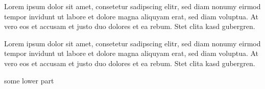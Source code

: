\begin{tcolorbox}[]

Lorem ipsum dolor sit amet, consetetur sadipscing elitr, sed diam nonumy
eirmod tempor invidunt ut labore et dolore magna aliquyam erat, sed diam
voluptua. At vero eos et accusam et justo duo dolores et ea rebum. Stet
clita kasd gubergren.

\end{tcolorbox}



\begin{tcolorbox}[colback=c_ffffff,colframe=c_000000,title=Title]

Lorem ipsum dolor sit amet, consetetur sadipscing elitr, sed diam nonumy
eirmod tempor invidunt ut labore et dolore magna aliquyam erat, sed diam
voluptua. At vero eos et accusam et justo duo dolores et ea rebum. Stet
clita kasd gubergren.

\tcblower

some lower part

\end{tcolorbox}
